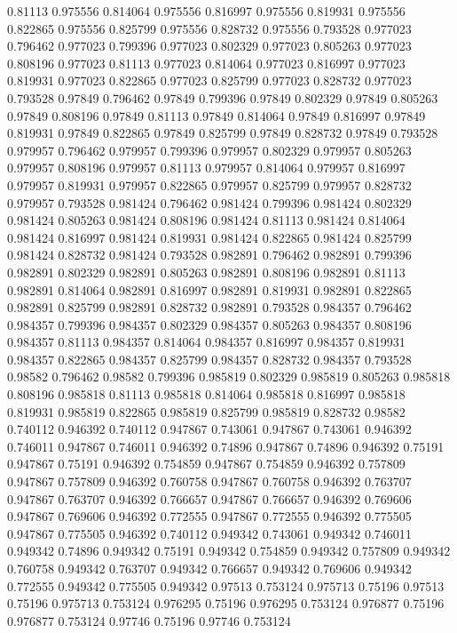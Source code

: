 0.81113 0.975556
0.814064 0.975556
0.816997 0.975556
0.819931 0.975556
0.822865 0.975556
0.825799 0.975556
0.828732 0.975556
0.793528 0.977023
0.796462 0.977023
0.799396 0.977023
0.802329 0.977023
0.805263 0.977023
0.808196 0.977023
0.81113 0.977023
0.814064 0.977023
0.816997 0.977023
0.819931 0.977023
0.822865 0.977023
0.825799 0.977023
0.828732 0.977023
0.793528 0.97849
0.796462 0.97849
0.799396 0.97849
0.802329 0.97849
0.805263 0.97849
0.808196 0.97849
0.81113 0.97849
0.814064 0.97849
0.816997 0.97849
0.819931 0.97849
0.822865 0.97849
0.825799 0.97849
0.828732 0.97849
0.793528 0.979957
0.796462 0.979957
0.799396 0.979957
0.802329 0.979957
0.805263 0.979957
0.808196 0.979957
0.81113 0.979957
0.814064 0.979957
0.816997 0.979957
0.819931 0.979957
0.822865 0.979957
0.825799 0.979957
0.828732 0.979957
0.793528 0.981424
0.796462 0.981424
0.799396 0.981424
0.802329 0.981424
0.805263 0.981424
0.808196 0.981424
0.81113 0.981424
0.814064 0.981424
0.816997 0.981424
0.819931 0.981424
0.822865 0.981424
0.825799 0.981424
0.828732 0.981424
0.793528 0.982891
0.796462 0.982891
0.799396 0.982891
0.802329 0.982891
0.805263 0.982891
0.808196 0.982891
0.81113 0.982891
0.814064 0.982891
0.816997 0.982891
0.819931 0.982891
0.822865 0.982891
0.825799 0.982891
0.828732 0.982891
0.793528 0.984357
0.796462 0.984357
0.799396 0.984357
0.802329 0.984357
0.805263 0.984357
0.808196 0.984357
0.81113 0.984357
0.814064 0.984357
0.816997 0.984357
0.819931 0.984357
0.822865 0.984357
0.825799 0.984357
0.828732 0.984357
0.793528 0.98582
0.796462 0.98582
0.799396 0.985819
0.802329 0.985819
0.805263 0.985818
0.808196 0.985818
0.81113 0.985818
0.814064 0.985818
0.816997 0.985818
0.819931 0.985819
0.822865 0.985819
0.825799 0.985819
0.828732 0.98582
0.740112 0.946392
0.740112 0.947867
0.743061 0.947867
0.743061 0.946392
0.746011 0.947867
0.746011 0.946392
0.74896 0.947867
0.74896 0.946392
0.75191 0.947867
0.75191 0.946392
0.754859 0.947867
0.754859 0.946392
0.757809 0.947867
0.757809 0.946392
0.760758 0.947867
0.760758 0.946392
0.763707 0.947867
0.763707 0.946392
0.766657 0.947867
0.766657 0.946392
0.769606 0.947867
0.769606 0.946392
0.772555 0.947867
0.772555 0.946392
0.775505 0.947867
0.775505 0.946392
0.740112 0.949342
0.743061 0.949342
0.746011 0.949342
0.74896 0.949342
0.75191 0.949342
0.754859 0.949342
0.757809 0.949342
0.760758 0.949342
0.763707 0.949342
0.766657 0.949342
0.769606 0.949342
0.772555 0.949342
0.775505 0.949342
0.97513 0.753124
0.975713 0.75196
0.97513 0.75196
0.975713 0.753124
0.976295 0.75196
0.976295 0.753124
0.976877 0.75196
0.976877 0.753124
0.97746 0.75196
0.97746 0.753124
